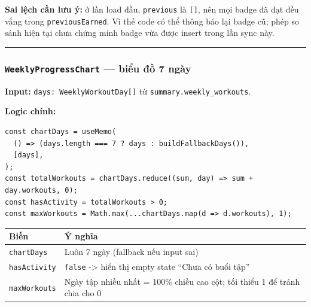 \documentclass[12pt,a4paper]{article}
\newcounter{none}
\begin{document}
\textbf{Sai lệch cần lưu ý:} ở lần load đầu, \texttt{previous} là
\texttt{{[}{]}}, nên mọi badge đã đạt đều vắng trong
\texttt{previousEarned}. Vì thế code có thể thông báo lại badge cũ; phép
so sánh hiện tại chưa chứng minh badge vừa được insert trong lần sync
này.

\begin{center}\rule{0.5\linewidth}{0.5pt}\end{center}

\subsubsection{\texorpdfstring{\texttt{WeeklyProgressChart} --- biểu đồ
7
ngày}{WeeklyProgressChart --- biểu đồ 7 ngày}}\label{weeklyprogresschart-biux1ec3u-ux111ux1ed3-7-nguxe0y}

\textbf{Input:} \texttt{days:\ WeeklyWorkoutDay{[}{]}} từ
\texttt{summary.weekly\_workouts}.

\textbf{Logic chính:}

\begin{verbatim}
const chartDays = useMemo(
  () => (days.length === 7 ? days : buildFallbackDays()),
  [days],
);
const totalWorkouts = chartDays.reduce((sum, day) => sum + day.workouts, 0);
const hasActivity = totalWorkouts > 0;
const maxWorkouts = Math.max(...chartDays.map(d => d.workouts), 1);

\end{verbatim}

{\def\LTcaptype{none} %
\begin{longtable}[]{@{}
  >{\raggedright\arraybackslash}p{}
  >{\raggedright\arraybackslash}p{}@{}}
\toprule\noalign{}
\begin{minipage}[b]{\linewidth}\raggedright
Biến
\end{minipage} & \begin{minipage}[b]{\linewidth}\raggedright
Ý nghĩa
\end{minipage} \\
\midrule\noalign{}
\endhead
\bottomrule\noalign{}
\endlastfoot
\texttt{chartDays} & Luôn 7 ngày (fallback nếu input sai) \\
\texttt{hasActivity} & \texttt{false} -\textgreater{} hiển thị empty
state ``Chưa có buổi tập'' \\
\texttt{maxWorkouts} & Ngày tập nhiều nhất = 100\% chiều cao cột; tối
thiểu 1 để tránh chia cho 0 \\
\end{longtable}
}
\end{document}
